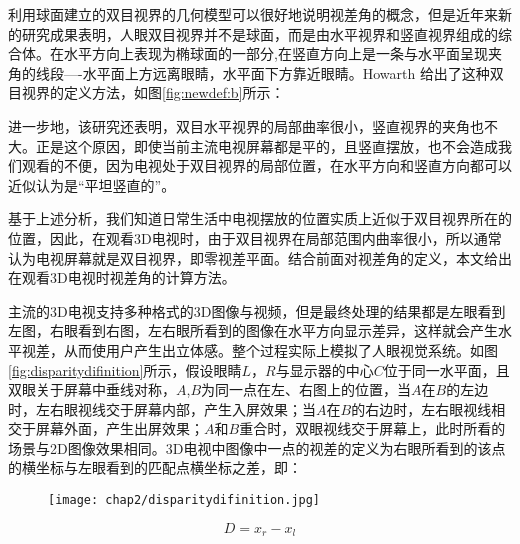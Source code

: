 \begin{figure}
  \centering
  \hspace{1in}
\end{figure}
利用球面建立的双目视界的几何模型可以很好地说明视差角的概念，但是近年来新的研究成果表明，人眼双目视界并不是球面，而是由水平视界和竖直视界组成的综合体。在水平方向上表现为椭球面的一部分,在竖直方向上是一条与水平面呈现夹角的线段----水平面上方远离眼睛，水平面下方靠近眼睛。Howarth \parencite{howarth2011geometric}给出了这种双目视界的定义方法，如图\ref{fig:newdef:b}所示\parencite{zhu20143d}：

进一步地，该研究还表明，双目水平视界的局部曲率很小，竖直视界的夹角也不大。正是这个原因，即使当前主流电视屏幕都是平的，且竖直摆放，也不会造成我们观看的不便，因为电视处于双目视界的局部位置，在水平方向和竖直方向都可以近似认为是“平坦竖直的”。

基于上述分析，我们知道日常生活中电视摆放的位置实质上近似于双目视界所在的位置，因此，在观看3D电视时，由于双目视界在局部范围内曲率很小，所以通常认为电视屏幕就是双目视界，即零视差平面。结合前面对视差角的定义，本文给出在观看3D电视时视差角的计算方法。

主流的3D电视支持多种格式的3D图像与视频，但是最终处理的结果都是左眼看到左图，右眼看到右图，左右眼所看到的图像在水平方向显示差异，这样就会产生水平视差，从而使用户产生出立体感。整个过程实际上模拟了人眼视觉系统。如图\ref{fig:disparitydifinition}所示，假设眼睛$L$，$R$与显示器的中心$C$位于同一水平面，且双眼关于屏幕中垂线对称，$A$,$B$为同一点在左、右图上的位置，当$A$在$B$的左边时，左右眼视线交于屏幕内部，产生入屏效果；当$A$在$B$的右边时，左右眼视线相交于屏幕外面，产生出屏效果；$A$和$B$重合时，双眼视线交于屏幕上，此时所看的场景与2D图像效果相同。3D电视中图像中一点的视差的定义为右眼所看到的该点的横坐标与左眼看到的匹配点横坐标之差，即：
\begin{figure}[!htp]
  \centering
  \texttt{[image: chap2/disparitydifinition.jpg]}
\end{figure}
\begin{equation}
\label{chap2:eq:disparitypixel}
D = {x_r} - {x_l}
\end{equation}

